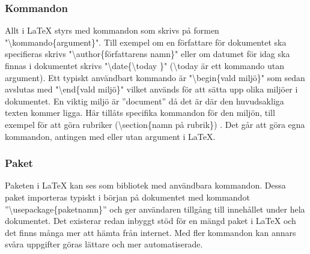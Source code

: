 \subsubsection{Kommandon}
Allt i {\LaTeX} styrs med kommandon som skrivs på formen "\textbackslash kommando\{argument\}". Till exempel om en författare för dokumentet ska specifieras skrivs "\textbackslash author\{författarens namn\}" \hspace{0.2mm} eller om datumet för idag ska finnas i dokumentet skrivs "\textbackslash date\{\textbackslash today \}" \hspace{0.2mm} (\textbackslash today är ett kommando utan argument). Ett typiskt användbart kommando är "\textbackslash begin\{vald miljö\}" \hspace{0.2mm} som sedan avslutas med "\textbackslash end\{vald miljö\}" \hspace{0.2mm} vilket används för att sätta upp olika miljöer i dokumentet. En viktig miljö är ''document''  då det är där den huvudsakliga texten kommer ligga. Här tillåts specifika kommandon för den miljön, till exempel för att göra rubriker (\textbackslash section\{namn på rubrik\}) .
\newline
\newline
Det går att göra egna kommandon, antingen med eller utan argument i {\LaTeX}.   

\subsubsection{Paket}
Paketen i {\LaTeX} kan ses som bibliotek med användbara kommandon. Dessa paket importeras typiskt i början på dokumentet med kommandot ''\textbackslash usepackage\{paketnamn\}'' och ger användaren tillgång till innehållet under hela dokumentet. Det existerar redan inbyggt stöd för en mängd paket i {\LaTeX} och det finns många mer att hämta från internet. Med fler kommandon kan annars svåra uppgifter göras lättare och mer automatiserade.  

